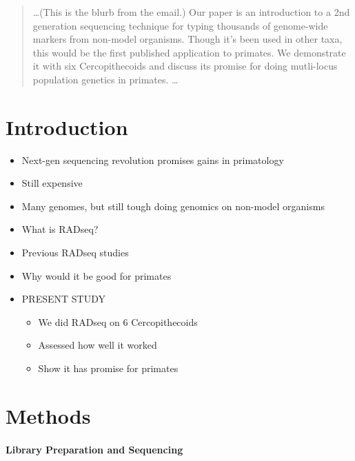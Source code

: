 \documentclass[12pt]{article}
\begin{document}
\maketitle

\begin{abstract}
\ldots (This is the blurb from the email.) Our paper is an introduction to a 2nd generation sequencing technique for typing thousands of genome-wide markers from non-model organisms. Though it's been used in other taxa, this would be the first published application to primates. We demonstrate it with six Cercopithecoids and discuss its promise for doing mutli-locus population genetics in primates. \ldots
\end{abstract}

\section{Introduction}
\begin{itemize}
	\item Next-gen sequencing revolution promises gains in primatology
	\item Still expensive
	\item Many genomes, but still tough doing genomics on non-model organisms
	\item What is RADseq?
	\item Previous RADseq studies
	\item Why would it be good for primates
	\item PRESENT STUDY
	\begin{itemize}
		\item We did RADseq on 6 Cercopithecoids
		\item Assessed how well it worked
		\item Show it has promise for primates
	\end{itemize}
\end{itemize}

\section{Methods}

\paragraph{Library Preparation and Sequencing}
\end{document}

